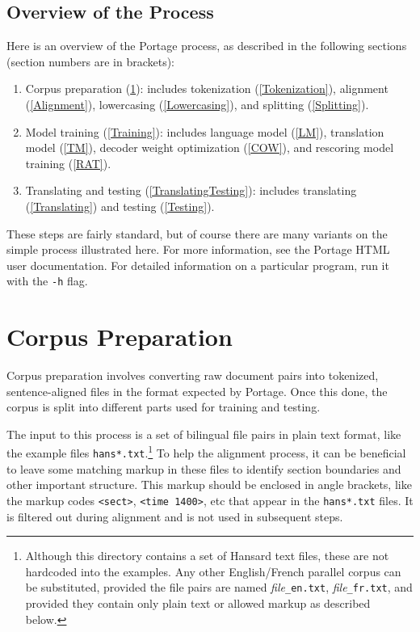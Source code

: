 \documentclass[11pt]{article}
\begin{document}
\subsection{Overview of the Process}

Here is an overview of the Portage process, as described in the following
sections (section numbers are in brackets):
\begin{enumerate}
\item Corpus preparation (\ref{CorpusPreparation}): includes tokenization
      (\ref{Tokenization}), alignment (\ref{Alignment}), lowercasing
      (\ref{Lowercasing}), and splitting (\ref{Splitting}).
\item Model training (\ref{Training}): includes language model (\ref{LM}),
      translation model (\ref{TM}), decoder weight optimization (\ref{COW}),
      and rescoring model training (\ref{RAT}).
    \item Translating and testing (\ref{TranslatingTesting}): includes
      translating (\ref{Translating}) and testing (\ref{Testing}).
\end{enumerate}
These steps are fairly standard, but of course there are many variants on the
simple process illustrated here. For more information, see the Portage HTML
user documentation. For detailed information on a particular program, run it
with the {\tt -h} flag.

\section{Corpus Preparation} \label{CorpusPreparation}

Corpus preparation involves converting raw document pairs into tokenized,
sentence-aligned files in the format expected by Portage. Once this done,
the corpus is split into different parts used for training and testing.

The input to this process is a set of bilingual file pairs in plain text
format, like the example files {\tt hans*.txt}.\footnote{Although
  this directory contains a set of Hansard text files, these are not hardcoded
  into the examples. Any other English/French parallel corpus can be
  substituted, provided the file pairs are named {\em file}{\tt\_en.txt}, {\em
    file}{\tt\_fr.txt}, and provided they contain only plain text or allowed
  markup as described below.}
 To help the alignment process,
it can be beneficial to leave some matching markup in these files to identify
section boundaries and other important structure. This markup should be
enclosed in angle brackets, like the markup codes {\tt <sect>}, {\tt <time
  1400>}, etc that appear in the {\tt hans*.txt} files. It is filtered out
during alignment and is not used in subsequent steps.
\end{document}
